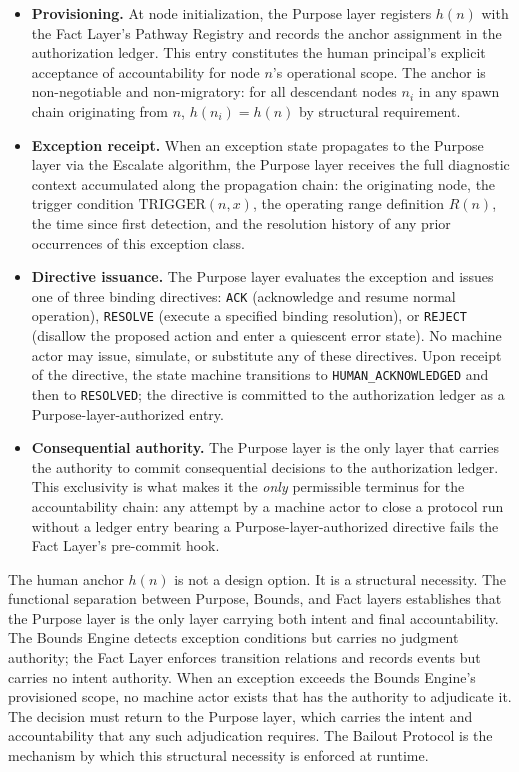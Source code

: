 \begin{itemize}\itemsep=0pt
\item[(\textit{i})] \textbf{Provisioning.} At node initialization, the Purpose layer registers $h(n)$ with the Fact Layer's Pathway Registry and records the anchor assignment in the authorization ledger. This entry constitutes the human principal's explicit acceptance of accountability for node $n$'s operational scope. The anchor is non-negotiable and non-migratory: for all descendant nodes $n_i$ in any spawn chain originating from $n$, $h(n_i) = h(n)$ by structural requirement.

\item[(\textit{ii})] \textbf{Exception receipt.} When an exception state propagates to the Purpose layer via the Escalate algorithm, the Purpose layer receives the full diagnostic context accumulated along the propagation chain: the originating node, the trigger condition $\mathrm{TRIGGER}(n, x)$, the operating range definition $R(n)$, the time since first detection, and the resolution history of any prior occurrences of this exception class.

\item[(\textit{iii})] \textbf{Directive issuance.} The Purpose layer evaluates the exception and issues one of three binding directives: \texttt{ACK} (acknowledge and resume normal operation), \texttt{RESOLVE} (execute a specified binding resolution), or \texttt{REJECT} (disallow the proposed action and enter a quiescent error state). No machine actor may issue, simulate, or substitute any of these directives. Upon receipt of the directive, the state machine transitions to \texttt{HUMAN\_ACKNOWLEDGED} and then to \texttt{RESOLVED}; the directive is committed to the authorization ledger as a Purpose-layer-authorized entry.

\item[(\textit{iv})] \textbf{Consequential authority.} The Purpose layer is the only layer that carries the authority to commit consequential decisions to the authorization ledger. This exclusivity is what makes it the \emph{only} permissible terminus for the accountability chain: any attempt by a machine actor to close a protocol run without a ledger entry bearing a Purpose-layer-authorized directive fails the Fact Layer's pre-commit hook.
\end{itemize}

The human anchor $h(n)$ is not a design option. It is a structural necessity. The functional separation between Purpose, Bounds, and Fact layers establishes that the Purpose layer is the only layer carrying both intent and final accountability. The Bounds Engine detects exception conditions but carries no judgment authority; the Fact Layer enforces transition relations and records events but carries no intent authority. When an exception exceeds the Bounds Engine's provisioned scope, no machine actor exists that has the authority to adjudicate it. The decision must return to the Purpose layer, which carries the intent and accountability that any such adjudication requires. The Bailout Protocol is the mechanism by which this structural necessity is enforced at runtime.

